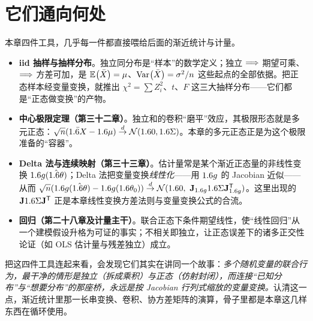 \section{它们通向何处}
\label{sec:jointdist-7}

本章四件工具，几乎每一件都直接喂给后面的渐近统计与计量。

\begin{itemize}
    \item \textbf{iid 抽样与抽样分布}。独立同分布是``样本''的数学定义；独立 $\Longrightarrow$ 期望可乘、$\Longrightarrow$ 方差可加，是 $\mathbb{E}_{}\!\left(\bar X\right)=\mu$、$\operatorname{Var}_{}\!\left(\bar X\right)=\sigma^2/n$ 这些起点的全部依据。把正态样本经变量变换，就推出 $\chi^2=\sum Z_i^2$、$t$、$F$ 这三大抽样分布——它们都是``正态做变换''的产物。
    \item \textbf{中心极限定理（第三十二章）}。独立和的卷积``磨平''效应，其极限形态就是多元正态：$\sqrt{n}(\bar{1.6 X}-1.6\mu)\overset{d}{\to}\mathcal{N}(1.6 0,1.6\Sigma)$。本章的多元正态正是为这个极限准备的``容器''。
    \item \textbf{Delta 法与连续映射（第三十三章）}。估计量常是某个渐近正态量的非线性变换 $1.6 g(\hat{1.6\theta})$；Delta 法把变量变换\emph{线性化}——用 $1.6 g$ 的 Jacobian 近似——从而 $\sqrt{n}(1.6 g(\hat{1.6\theta})-1.6 g(1.6\theta_0))\overset{d}{\to}\mathcal{N}(1.6 0,\ \mathbf{J}_{1.6 g}1.6\Sigma\mathbf{J}_{1.6 g}^{\mathsf{T}})$。这里出现的 $\mathbf{J}1.6\Sigma\mathbf{J}^{\mathsf{T}}$ 正是本章线性变换方差法则与变量变换公式的合流。
    \item \textbf{回归（第二十八章及计量主干）}。联合正态下条件期望线性，使``线性回归''从一个建模假设升格为可证的事实；不相关即独立，让正态误差下的诸多正交性论证（如 OLS 估计量与残差独立）成立。
\end{itemize}

把这四件工具连起来看，会发现它们其实在讲同一个故事：\emph{多个随机变量的联合行为，最干净的情形是独立（拆成乘积）与正态（仿射封闭），而连接``已知分布''与``想要分布''的那座桥，永远是按 Jacobian 行列式缩放的变量变换。}认清这一点，渐近统计里那一长串变换、卷积、协方差矩阵的演算，骨子里都是本章这几样东西在循环使用。
